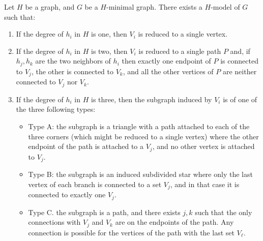 \documentclass[a4paper,thm-restate,USenglish]{lipics-v2019}
\begin{document}
\begin{corollary}\label{coro:Hminimal_prop}
Let $H$ be a graph, and $G$ be a $H$-minimal graph. There exists a $H$-model of $G$ such that: 
\begin{enumerate}
    \item If the degree of $h_i$ in $H$ is one, then $V_i$ is reduced to a single vertex.
    \item If the degree of $h_i$ in $H$ is two, then $V_i$ is reduced to a single path $P$ and, if $h_j,h_k$ are the two neighbors of $h_i$ then exactly one endpoint of $P$ is connected to  $V_j$, the other is connected to $V_k$, and all the other vertices of $P$ are neither connected to $V_j$ nor $V_k$.
    \item If the degree of $h_i$ in $H$ is three, then the subgraph induced by $V_i$ is of one of the three following types:
    \begin{itemize}
        \item Type A: the subgraph is a triangle with a path attached to each of the three corners (which might be reduced to a single vertex) where the other endpoint of the path is attached to a $V_j$, and no other vertex is attached to $V_j$.
        \item Type B: the subgraph is an induced subdivided star where only the last vertex of each branch is connected to a set $V_j$, and in that case it is connected to exactly one $V_j$.
        \item Type C. the subgraph is a path, and there exists $j,k$ such that the only connections with $V_j$ and $V_{k}$ are on the endpoints of the path. Any connection is possible for the vertices of the path with the last set $V_{\ell}$.
    \end{itemize}
\end{enumerate}
\end{corollary}
\end{document}

